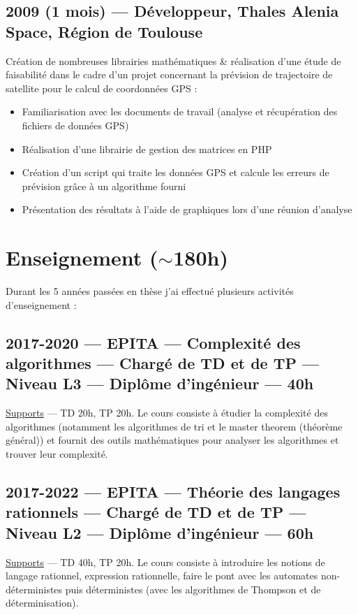 \documentclass[11pt,a4paper,sans]{article} %
\begin{document}
\subsection{2009 (1 mois) --- Développeur, Thales Alenia Space, Région de Toulouse}
Création de nombreuses librairies mathématiques \& réalisation d'une étude de faisabilité dans le cadre d'un projet
concernant la prévision de trajectoire de satellite pour le calcul de coordonnées GPS :
\begin{itemize}
  \item Familiarisation avec les documents de travail (analyse et récupération des fichiers de données GPS)
  \item Réalisation d'une librairie de gestion des matrices en PHP
  \item Création d'un script qui traite les données GPS et calcule les erreurs de prévision grâce à un algorithme fourni
  \item Présentation des résultats à l'aide de graphiques lors d'une réunion d'analyse
\end{itemize}


\section{Enseignement (\(\sim\)180h)}

Durant les 5 années passées en thèse j'ai effectué plusieurs activités d'enseignement :

\subsection{2017-2020 --- EPITA --- Complexité des algorithmes --- Chargé de TD et de TP --- Niveau L3 --- Diplôme
  d'ingénieur --- 40h}

\href{https://www.lrde.epita.fr/~adl/ens/cpxa}{Supports} --- TD 20h, TP 20h. Le  cours consiste à étudier la complexité
des algorithmes (notamment les algorithmes de tri et le master theorem (théorème général)) et fournit des outils
mathématiques pour analyser les algorithmes et trouver leur complexité.

\subsection{2017-2022 --- EPITA --- Théorie des langages rationnels --- Chargé de TD et de TP --- Niveau L2 --- Diplôme
  d'ingénieur --- 60h}

\href{http://jo.fabrizio.free.fr/teaching/thlr/}{Supports} --- TD 40h, TP 20h. Le cours consiste à introduire les
notions de langage rationnel, expression rationnelle, faire le pont avec les automates non-déterministes puis
déterministes (avec les algorithmes de Thompson et de déterminisation).
\end{document}
